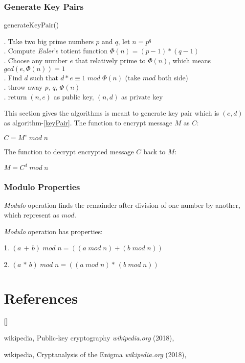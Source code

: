 \documentclass[twoside]{article}
\def\beginrefs{\begin{list}%
        {[\arabic{equation}]}{\usecounter{equation}
         \setlength{\leftmargin}{2.0truecm}\setlength{\labelsep}{0.4truecm}%
         \setlength{\labelwidth}{1.6truecm}}}
\def\endrefs{\end{list}}
\def\bibentry#1{\item[\hbox{[#1]}]}
\begin{document}
\subsubsection{Generate Key Pairs}

\begin{algorithm}[H]
    \caption{generateKeyPair()}
\begin{algorithmic}

    . Take two big prime numbers $p$ and $q$, let $n=p^q$
    \\
    . Compute \textit{Euler}'s totient function $\Phi(n)=(p - 1)\ast(q - 1)$
    \\
    . Choose any number $e$ that relatively prime to $\Phi(n)$, which means
    $gcd(e, \Phi(n)) = 1$
    \\
    . Find $d$ such that $d\ast e \equiv 1\; mod\; \Phi(n)$ (take $mod$ both side)
    \\
    . throw away $p$, $q$, $\Phi(n)$
    \\
    . return $(n, e)$ as public key, $(n, d)$ as private key
\end{algorithmic}
    \label{keyPair}
\end{algorithm}
This section gives the algorithms is meant to generate key pair which is $(e, d)$ as algorithm-\ref{keyPair}.
The function to encrypt message $M$ as $C$:

$C = M^e\; mod\; n$

The function to decrypt encrypted message $C$ back to $M$:

$M = C^d\; mod\; n$

\subsubsection{Modulo Properties}

\textit{Modulo} operation finds the remainder after division of one number by another,
which represent as $mod$.

\textit{Modulo} operation has properties:

1. $(a\, +\, b)\; mod\; n = ((a\; mod\; n) + (b\; mod\; n))$

2. $(a\, \ast\, b)\; mod\; n = ((a\; mod\; n) \ast\, (b\; mod\; n))$


\clearpage
\section*{References}
\beginrefs
\bibentry{WikiRSA}{\sc wikipedia},
Public-key cryptography
{\it wikipedia.org} (2018),

\bibentry{WikiEnigma}{\sc wikipedia},
Cryptanalysis of the Enigma
{\it wikipedia.org} (2018),

\endrefs
\end{document}
